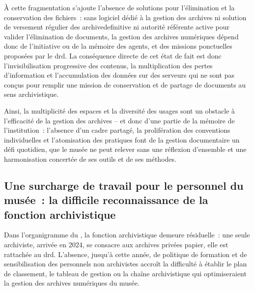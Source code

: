 À cette fragmentation s’ajoute l’absence de solutions pour l’élimination et la conservation des fichiers~: sans logiciel dédié à la gestion des archives ni solution de versement régulier des \gls{archivedefinitive} ni autorité référente active pour valider l'élimination de documents, la gestion des archives numériques dépend donc de l’initiative ou de la mémoire des agents, et des missions ponctuelles proposées par le \ac{drd}. La conséquence directe de cet état de fait est donc l’invisibilisation progressive des contenus, la multiplication des pertes d’information et l'accumulation des données sur des serveurs qui ne sont pas conçus pour remplir une mission de conservation et de partage de documents au sens archivistique. 



Ainsi, la multiplicité des espaces et la diversité des usages sont un obstacle à l'efficacité de la gestion des archives -- et donc d'une partie de la mémoire de l'institution~: l’absence d’un cadre partagé, la prolifération des conventions individuelles et l’atomisation des pratiques font de la gestion documentaire un défi quotidien, que le musée ne peut relever sans une réflexion d’ensemble et une harmonisation concertée de ses outils et de ses méthodes.


\subsection{Une surcharge de travail pour le personnel du musée~: la difficile reconnaissance de la fonction archivistique}


Dans l’organigramme du \mae, la fonction archivistique demeure résiduelle~: une seule archiviste, arrivée en 2024, se consacre aux archives privées papier, elle est rattachée au \ac{drd}. L’absence, jusqu'à cette année, de politique de formation et de sensibilisation des personnels non archivistes accroît la difficulté à établir le plan de classement, le tableau de gestion ou la chaîne archivistique qui optimiseraient la gestion des archives numériques du musée.

